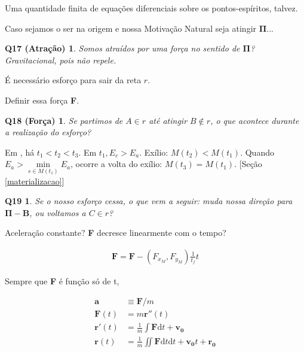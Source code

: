 \documentclass[12pt,a4paper]{article}
\begin{document}
			Uma quantidade finita de equa\c{c}\~oes diferenciais sobre os pontos-esp\'iritos, talvez.

			Caso sejamos o ser na origem e nossa Motiva\c{c}\~ao Natural seja atingir $ \mathbf{\Pi} $...

			\newtheorem{Q17}{Q17 (Atra\c{c}\~ao)}
			\begin{Q17} Somos atra\'idos por uma for\c{c}a no sentido de $ \mathbf{\Pi} $? Gravitacional, pois n\~ao repele.
			\end{Q17}

			\'E necess\'ario esfor\c{c}o para sair da reta $r$.

			Definir essa for\c{c}a \textbf{F}.

			\newtheorem{Q18}{Q18 (For\c{c}a)}
			\begin{Q18} Se partimos de $ A \in r $ at\'e atingir $ B \notin r $, o que acontece durante a realiza\c{c}\~ao do esfor\c{c}o?
			\end{Q18}

			Em \cite{capela}, h\'a $t_1 < t_2 < t_3$. Em $t_1, E_c > E_a$. Ex\'ilio: $M(t_2) < M(t_1)$. Quando $E_a > \underset{s \in M(t_1)}{\operatorname{\min}} E_a$, ocorre a volta do ex\'ilio: $M(t_3) = M(t_1)$. [Se\c{c}\~ao \ref{materializacao}]

			\newtheorem{Q19}{Q19}
			\begin{Q19} Se o nosso esfor\c{c}o cessa, o que vem a seguir: muda nossa dire\c{c}\~ao para $ \mathbf{\Pi} - \mathbf{B} $, ou voltamos a $ C \in r $?
			\end{Q19}

			Acelera\c{c}\~ao constante? \textbf{F} decresce linearmente com o tempo?

			\begin{align*}
			\mathbf{F} = \mathbf{F} - \left(F_{x_M}, F_{y_M}\right) \frac{1}{t_f} t
			\end{align*}

			Sempre que \textbf{F} \'e fun\c{c}\~ao s\'o de t,

			\begin{align*}
				\mathbf{a} &\equiv \mathbf{F} / m \\
				\mathbf{F}(t) &= m \mathbf{r}''(t) \\
				\mathbf{r}'(t) &= \frac{1}{m} \int \mathbf{F} \mathrm{d}t + \mathbf{v_0} \\
				\mathbf{r}(t) &= \frac{1}{m} \iint \mathbf{F} \mathrm{d}t \mathrm{d}t + \mathbf{v_0} t + \mathbf{r_0}
			\end{align*}
\end{document}
